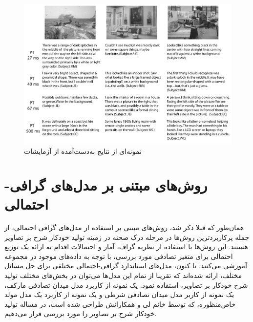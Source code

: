 \begin{figure}[h]
	\center
	\includegraphics[scale=0.4]{./Imgs/fei2007we_res4.png}
	\caption{نمونه‌ای از نتایج به‌دست‌آمده از آزمایشات\cite{fei2007we}}
	\label{fig:f2007res4}
\end{figure}

\section{روش‌های مبتنی بر مدل‌های گرافی-احتمالی}

همان‌طور که قبلا ذکر شد، روش‌های مبتنی بر استفاده از مدل‌های گرافی احتمالی، از جمله پرکاربردترین روش‌ها در مرحله درک صحنه در زمینه تولید خودکار شرح بر تصاویر هستند. این روش‌ها با استفاده از نظریه گراف، آمار و احتمالات اقدام به ارائه یک توزیع احتمالی برای متغیر تصادفی مورد بررسی، با توجه به داده‌های موجود در مجموعه آموزشی می‌کنند. تا کنون، مدل‌های استاندارد گرافی-احتمالی مختلفی برای حل مسائل مختلف، ارائه شده‌اند که تقریبا از تمام این مدل‌ها می‌توان در بخش‌های مختلف تولید شرح خودکار بر تصاویر، استفاده نمود. یک نمونه از کاربرد مدل میدان تصادفی مارکف، یک نمونه از کاربر مدل میدان تصادفی شرطی و یک نمونه از کاربرد یک مدل مولد خاص‌منظوره، که توسط خانم لی و همکارانش طراحی شده است، در مساله تولید خودکار شرح بر تصاویر را مورد بررسی قرار می‌دهیم.

